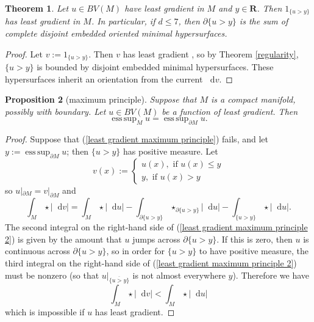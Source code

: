 \documentclass[reqno,11pt]{amsart}
\newcommand{\RR}{\mathbf{R}}
\newcommand*\dif{\mathop{}\!\mathrm{d}}
\DeclareMathOperator*{\esssup}{ess\,sup}
\newtheorem{theorem}{Theorem}[section]
\newtheorem{proposition}[theorem]{Proposition}
\theoremstyle{definition}
\numberwithin{equation}{section}
\begin{document}
\begin{theorem}\label{main thm of old paper}
Let $u \in BV(M)$ have least gradient in $M$ and $y \in \RR$. Then $1_{\{u > y\}}$ has least gradient in $M$.
In particular, if $d \leq 7$, then $\partial \{u > y\}$ is the sum of complete disjoint embedded oriented minimal hypersurfaces.
\end{theorem}
\begin{proof}
Let $v := 1_{\{u > y\}}$.
Then $v$ has least gradient \cite[Theorem 1]{BOMBIERI1969}, so by Theorem \ref{regularity}, $\{u > y\}$ is bounded by disjoint embedded minimal hypersurfaces.
These hypersurfaces inherit an orientation from the current $\dif v$.
\end{proof}

\begin{proposition}[maximum principle]
Suppose that $M$ is a compact manifold, possibly with boundary.
Let $u \in BV(M)$ be a function of least gradient.
Then 
\begin{equation}\label{least gradient maximum principle}
\esssup_M u = \esssup_{\partial M} u.
\end{equation}
\end{proposition}
\begin{proof}
Suppose that (\ref{least gradient maximum principle}) fails, and let $y := \esssup_{\partial M} u$; then $\{u > y\}$ has positive measure.
Let
$$v(x) := \begin{cases}
u(x), \text{ if } u(x) \leq y \\
y, \text{ if } u(x) > y 
\end{cases}$$
so $u|_{\partial M} = v|_{\partial M}$ and
\begin{equation}\label{least gradient maximum principle 2}
\int_M \star |\dif v| = \int_M \star |\dif u| - \int_{\partial \{u > y\}} \star_{\partial \{u > y\}} |\dif u| - \int_{\{u > y\}} \star |\dif u|.
\end{equation}
The second integral on the right-hand side of (\ref{least gradient maximum principle 2}) is given by the amount that $u$ jumps across $\partial \{u > y\}$.
If this is zero, then $u$ is continuous across $\partial \{u > y\}$, so in order for $\{u > y\}$ to have positive measure, the third integral on the right-hand side of (\ref{least gradient maximum principle 2}) must be nonzero (so that $u|_{\overline{\{u > y\}}}$ is not almost everywhere $y$).
Therefore we have 
$$\int_M \star |\dif v| < \int_M \star |\dif u|$$
which is impossible if $u$ has least gradient.
\end{proof}
\end{document}

